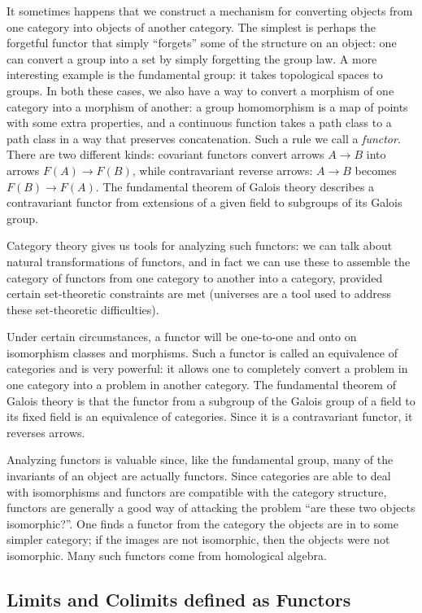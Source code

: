 \documentclass[12pt]{article}
\begin{document}
It sometimes happens that we construct a mechanism for converting objects from one category into objects of another category.  The simplest is perhaps the forgetful functor that simply ``forgets'' some of the structure on an object: one can convert a group into a set by simply forgetting the group law.  A more interesting example is the fundamental group: it takes topological spaces to groups. In both these cases, we also have a way to convert a morphism of one category into a morphism of another: a group homomorphism is a map of points with some extra properties, and a continuous function takes a path class to a path class in a way that preserves concatenation.   Such a rule we call a \emph{functor}.  There are two different kinds: covariant functors convert arrows $A\to B$ into arrows $F(A)\to F(B)$, while contravariant reverse arrows: $A\to B$ becomes $F(B)\to F(A)$.  The fundamental theorem of Galois theory describes a contravariant functor from extensions of a given field to subgroups of its Galois group.

Category theory gives us tools for analyzing such functors: we can talk about natural transformations of functors, and in fact we can use these to assemble the category of functors from one category to another into a category, provided certain set-theoretic constraints are met (universes are a tool used to address these set-theoretic difficulties).

Under certain circumstances, a functor will be one-to-one and onto on isomorphism classes and morphisms.  Such a functor is called an equivalence of categories and is very powerful: it allows one to completely convert a problem in one category into a problem in another category. The fundamental theorem of Galois theory is that the functor from a subgroup of the Galois group of a field to its fixed field is an equivalence of categories. Since it is a contravariant functor, it reverses arrows. 

Analyzing functors is valuable since, like the fundamental group, many of the invariants of an object are actually functors.  Since categories are able to deal with isomorphisms and functors are compatible with the category structure, functors are generally a good way of attacking the problem ``are these two objects isomorphic?''.  One finds a functor from the category the objects are in to some simpler category; if the images are not isomorphic, then the objects were not isomorphic.  Many such functors come from homological algebra.

\subsection{Limits and Colimits defined as Functors}
\end{document}
